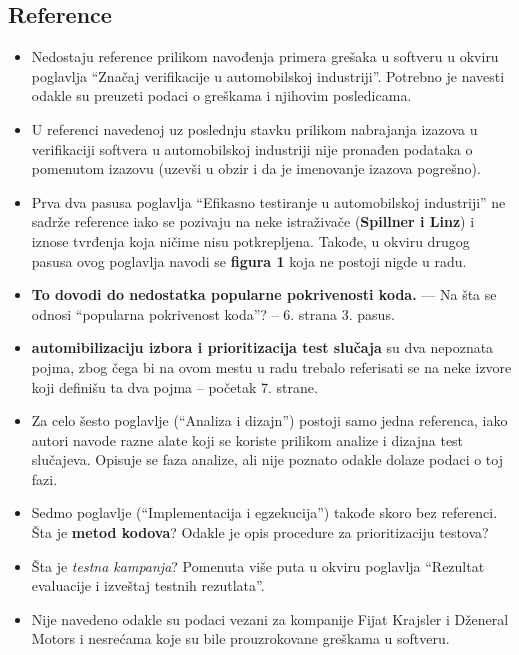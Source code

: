 \documentclass[a4paper]{report}
\begin{document}
\subsection{Reference}
\begin{itemize}
\item Nedostaju reference prilikom navođenja primera grešaka u softveru u okviru poglavlja ``Značaj verifikacije u automobilskoj industriji''. Potrebno je navesti odakle su preuzeti podaci o greškama i njihovim posledicama.
\item U referenci navedenoj uz poslednju stavku prilikom nabrajanja izazova u verifikaciji softvera u automobilskoj industriji nije pronađen podataka o pomenutom izazovu (uzevši u obzir i da je imenovanje izazova pogrešno).
\item Prva dva pasusa poglavlja ``Efikasno testiranje u automobilskoj industriji'' ne sadrže reference iako se pozivaju na neke istraživače ({\bf{Spillner i Linz}}) i iznose tvrđenja koja ničime nisu potkrepljena. Takođe, u okviru drugog pasusa ovog poglavlja navodi se {\bf{figura 1}} koja ne postoji nigde u radu.
\item {\bf{To dovodi do nedostatka popularne pokrivenosti koda.}} --- Na šta se odnosi ``popularna pokrivenost koda''? -- 6. strana 3. pasus.
\item {\bf{automibilizaciju izbora i prioritizacija test slučaja}} su dva nepoznata pojma, zbog čega bi na ovom mestu u radu trebalo referisati se na neke izvore koji definišu ta dva pojma -- početak 7. strane.
\item Za celo šesto poglavlje (``Analiza i dizajn'') postoji samo jedna referenca, iako autori navode razne alate koji se koriste prilikom analize i dizajna test slučajeva. Opisuje se faza analize, ali nije poznato odakle dolaze podaci o toj fazi.
\item Sedmo poglavlje (``Implementacija i egzekucija'') takođe skoro bez referenci. Šta je {\bf{metod kodova}}? Odakle je opis procedure za prioritizaciju testova?
\item Šta je {\em{testna kampanja}}? Pomenuta više puta u okviru poglavlja ``Rezultat evaluacije i izveštaj testnih rezutlata''.
\item Nije navedeno odakle su podaci vezani za kompanije Fijat Krajsler i Dženeral Motors i nesrećama koje su bile prouzrokovane greškama u softveru.
\end{itemize}
\end{document}
